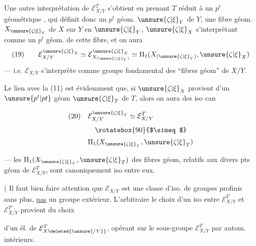 
Une autre interprétation de $\mathcal E_{X/Y}^T$ s'obtient en prenant $T$ réduit à un $p^t$ géométrique , qui définit donc un $p^t$ géom. $\unsure{\zeta|\xi}_Y$ de $Y$, une fibre géom. $X_{\unsure{\zeta|\xi}_Y}$ de $X$ sur $Y$ en $\unsure{\zeta|\xi}_Y$, $\unsure{\zeta|\xi}_X$ s'interprétant comme un $p^t$ géom. de cette fibre, et on aura
\[
(19)\qquad \mathcal E_{X/Y}^{\unsure{\zeta|\xi}_X}\simeq\mathcal E_{X_{(\unsure{\zeta|\xi}_Y)}}^{\unsure{\zeta|\xi}_X}\simeq\Pi_1(X_{(\unsure{\zeta|\xi}_Y)},\unsure{\zeta|\xi}_X)
\]
--- i.e. $\mathcal E_{X/Y}$ s'interprète comme groupe fondamental des ``fibres géom'' de $X/Y$.



Le lien avec la  (11) est évidemment que, si $\unsure{\zeta|\xi}_X$ provient d'un $\unsure{p^t|pt}$ géom $\unsure{\zeta|\xi}_T$ de $T$, alors on aura des iso can

\[
\begin{aligned}
(20)\quad &\mathcal E_{X/Y}^{\unsure{\zeta|\xi}_T}\simeq\mathcal E_{X/Y}^T\\[0.5ex]
&\quad\rotatebox{90}{$\simeq$}\\[0.5ex]
&\Pi_1(X_{\unsure{\zeta|\xi}_Y},\unsure{\zeta|\xi}_T)
\end{aligned}
\]

 --- les $\Pi_1(X_{\unsure{\zeta|\xi}_Y},\unsure{\zeta|\xi}_T)$ des fibres géom, relatifs aux divers pts géom de $\mathcal E_{X/Y}^T$, sont canoniquement iso entre eux.

( Il faut bien faire attention que $\mathcal E_{X/Y}$  est une classe d'iso. de groupes profinis sans plus, \uline{pas} un groupe extérieur. L'arbitraire  le choix d'un iso entre $\mathcal E_{X/Y}^T$ et $\mathcal E_{X/Y}^{T'}$ provient du choix



d'un él. de $\mathcal E_{X\deleted{\unsure{/Y}}}^T$, opérant
sur le sous-groupe $\mathcal E_{X/Y}^T$ par autom.
intérieurs.

